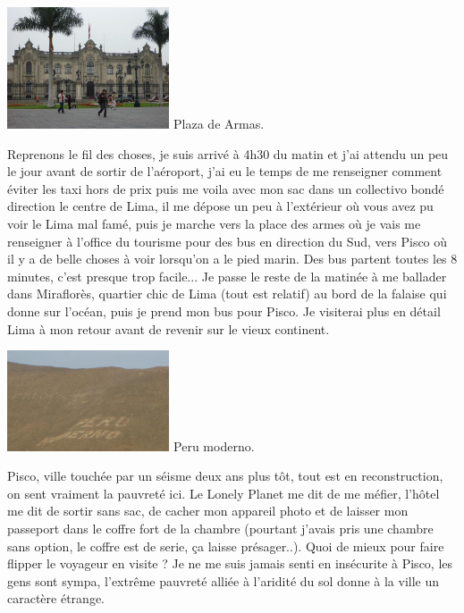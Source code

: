 \begin{multicols}{2}
\hspace*{-0.65cm}
\includegraphics[width=4.8cm]{articles/Cote-du-sud/1255996660JAoN.jpg}
Plaza de Armas.


Reprenons le fil des choses, je suis arrivé à 4h30 du matin et j'ai attendu un peu le jour avant de sortir de l'aéroport, j'ai eu le temps de me renseigner comment éviter les taxi hors de prix puis me voila avec mon sac dans un collectivo bondé direction le centre de Lima, il me dépose un peu  à l'extérieur où vous avez pu voir le Lima mal famé, puis je marche vers la place des armes où je vais me renseigner à l'office du tourisme pour des bus en direction du Sud, vers Pisco où il y a de belle choses à voir lorsqu'on a le pied marin. Des bus partent toutes les 8 minutes, c'est presque trop facile... Je passe le reste de la matinée à me ballader dans Miraflorès, quartier chic de Lima (tout est relatif) au bord de la falaise qui donne sur l'océan, puis je prend mon bus pour Pisco. Je visiterai plus en détail Lima à mon retour avant de revenir sur le vieux continent.

\hspace*{-0.65cm}
\includegraphics[width=4.8cm]{articles/Cote-du-sud/1255996643RUpx.jpg}
Peru moderno.


Pisco, ville touchée par un séisme deux ans plus tôt, tout est en reconstruction, on sent vraiment la pauvreté ici. Le Lonely Planet me dit de me méfier, l'hôtel me dit de sortir sans sac, de cacher mon appareil photo et de laisser mon passeport dans le coffre fort de la chambre (pourtant j'avais pris une chambre sans option, le coffre est de serie, ça laisse présager..). Quoi de mieux pour faire flipper le voyageur en visite ? Je ne me suis jamais senti en insécurite à Pisco, les gens sont sympa, l'extrême pauvreté alliée à l'aridité du sol donne à la ville un caractère étrange.


\end{multicols}
